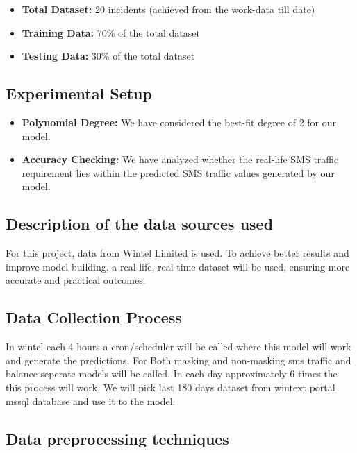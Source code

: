 \documentclass[12pt]{book} %
\begin{document}
\begin{itemize}
    \item \textbf{Total Dataset:} 20 incidents (achieved from the work-data till date)
    \item \textbf{Training Data:} 70\% of the total dataset
    \item \textbf{Testing Data:} 30\% of the total dataset
\end{itemize}

\subsection{Experimental Setup}

\begin{itemize}
    \item \textbf{Polynomial Degree:} We have considered the best-fit degree of 2 for our model.
    \item \textbf{Accuracy Checking:} We have analyzed whether the real-life SMS traffic requirement lies within the predicted SMS traffic values generated by our model.
\end{itemize}



\subsection{Description of the data sources used}
For this project, data from Wintel Limited is used. To achieve better results and improve model building, a real-life, real-time dataset will be used, ensuring more accurate and practical outcomes.

\subsection{Data Collection Process}
In wintel each 4 hours a cron/scheduler will be called where this model will work and generate the predictions. For Both masking and non-masking sms traffic and balance seperate models will be called. In each day approximately 6 times the this process will work. We will pick last 180 days dataset from wintext portal mssql database and use it to the model.

\subsection{Data preprocessing techniques}
\end{document}
